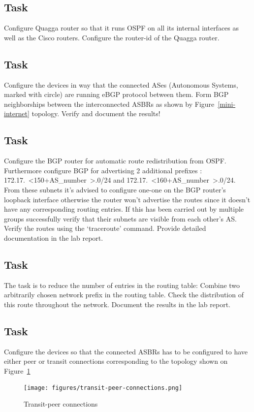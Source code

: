 \documentclass[a4paper]{article}
\begin{document}
\subsection{Task}
Configure Quagga router so that it runs OSPF on all its internal interfaces as well as the Cisco routers. Configure the
router-id of the Quagga router.
\subsection{Task}
Configure the devices in way that the connected ASes (Autonomous Systems, marked with circle) are running eBGP protocol
between them. Form BGP neighborships between the interconnected ASBRs as shown by Figure~\ref{mini-internet} topology.
Verify and document the results!
\subsection{Task}
Configure the BGP router for automatic route redistribution from OSPF. Furthermore configure BGP for advertising 2
additional prefixes : 172.17.~\textless150+AS\_number~\textgreater.0/24 and
172.17.~\textless160+AS\_number~\textgreater.0/24. From these subnets it's advised to configure one-one on the BGP
router's loopback interface otherwise the router won't advertise the routes since it doesn't have any corresponding
routing entries. If this has been carried out by multiple groups successfully verify that their subnets are visible
from each other's AS. Verify the routes using the `traceroute' command. Provide detailed documentation in the lab
report.
\subsection{Task}
The task is to reduce the number of entries in the routing table: Combine two arbitrarily chosen network prefix in the
routing table. Check the distribution of this route throughout the network. Document the results in the lab report.
\subsection{Task}
Configure the devices so that the connected ASBRs has to be configured to have either peer or transit connections
corresponding to the topology shown on Figure~\ref{fig:transit-connections}
\begin{figure}[H]
    \centering
    \texttt{[image: figures/transit-peer-connections.png]}
    \caption{Transit-peer connections}
    \label{fig:transit-connections}
\end{figure}
\end{document}
